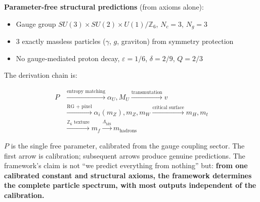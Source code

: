 \textbf{Parameter-free structural predictions} (from axioms alone):
\begin{itemize}\tightlist
\item Gauge group \(SU(3) \times SU(2) \times U(1)/\mathbb{Z}_6\), \(N_c = 3\), \(N_g = 3\)
\item 3 exactly massless particles (\(\gamma\), \(g\), graviton) from symmetry protection
\item No gauge-mediated proton decay, \(\varepsilon = 1/6\), \(\delta = 2/9\), \(Q = 2/3\)
\end{itemize}

The derivation chain is:

\[
\boxed{
\begin{aligned}
P &\xrightarrow{\text{entropy matching}} \alpha_U, M_U
\xrightarrow{\text{transmutation}} v \\
&\xrightarrow{\text{RG + pixel}} \alpha_i(m_Z), m_Z, m_W
\xrightarrow{\text{critical surface}} m_H, m_t \\
&\xrightarrow{\mathbb{Z}_6\text{ texture}} m_f
\xrightarrow{\Lambda_{\overline{\text{MS}}}} m_{\text{hadrons}}
\end{aligned}
}
\]

\(P\) is the single free parameter, calibrated from the gauge coupling sector. The first arrow is calibration; subsequent arrows produce genuine predictions. The framework's claim is not ``we predict everything from nothing'' but: \textbf{from one calibrated constant and structural axioms, the framework determines the complete particle spectrum, with most outputs independent of the calibration.}
